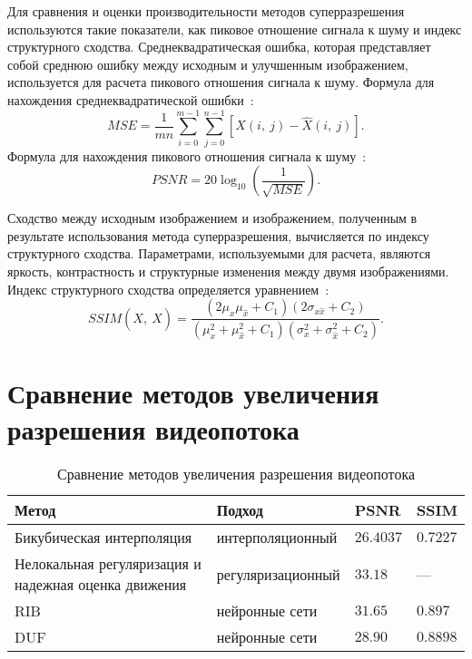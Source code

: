 \documentclass{bmstu}
\begin{document}
Для сравнения и оценки производительности методов суперразрешения используются такие показатели, как пиковое отношение сигнала к шуму и индекс структурного сходства. 
Среднеквадратическая ошибка, которая представляет собой среднюю ошибку между исходным и улучшенным изображением, используется для расчета пикового отношения сигнала к шуму. 
Формула для нахождения среднеквадратической ошибки~\cite{Daithankar2021}:
\begin{equation}
MSE = \frac{1}{mn} \sum_{i = 0}^{m - 1} \sum_{j = 0}^{n - 1} [X(i,~j) - \hat{X}(i,~j)].
\end{equation}
Формула для нахождения пикового отношения сигнала к шуму~\cite{Daithankar2021}:
\begin{equation}
PSNR = 20 \log_{10}(\frac{1}{\sqrt{MSE}}).
\end{equation}

Сходство между исходным изображением и изображением, полученным в результате использования метода суперразрешения, вычисляется по индексу структурного сходства. 
Параметрами, используемыми для расчета, являются яркость, контрастность и структурные изменения между двумя изображениями. 
Индекс структурного сходства определяется уравнением~\cite{Daithankar2021}:
\begin{equation}
SSIM(X,~\hat{X}) = \frac{(2 \mu_x \mu_{\hat{x}} + C_1)(2 \sigma_{x \hat{x}} + C_2)}{(\mu_x^2 + \mu_{\hat{x}}^2 + C_1)(\sigma_x^2 + \sigma_{\hat{x}}^2 + C_2)}.
\end{equation}

\section{Сравнение методов увеличения разрешения видеопотока}

\begin{table}[H]
\caption{Сравнение методов увеличения разрешения видеопотока}
\label{tabular:comparison}
\begin{tabular}{|p{4cm}|p{4.25cm}|p{3cm}|p{3cm}|}
\hline
\textbf{Метод} & \textbf{Подход} & \textbf{PSNR} & \textbf{SSIM}
\tabularnewline
\hline
Бикубическая интерполяция & интерполяционный & $26.4037$ & $0.7227$
\tabularnewline
\hline
Нелокальная регуляризация и надежная оценка движения & регуляризационный & $33.18$ & ---
\tabularnewline
\hline
RIB & нейронные сети & $31.65$ & $0.897$
\tabularnewline
\hline
DUF & нейронные сети & $28.90$ & $0.8898$
\tabularnewline
\hline
\end{tabular}
\end{table}
\end{document}
